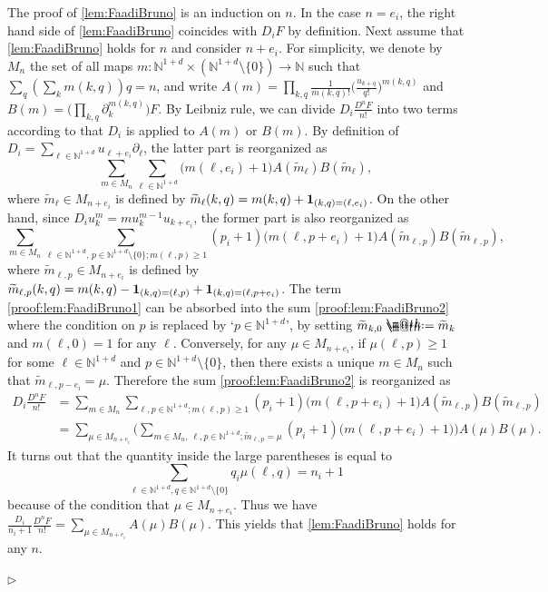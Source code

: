 \documentclass[10pt, reqno]{amsart}
\makeatletter
\numberwithin{subsection}{section}
\numberwithin{subsubsection}{subsection}
\numberwithin{equation}{section} %
\newenvironment{Dem}[1][\unskip]{%
    \begin{list}{\hspace{1.15cm}{\sf \textbf{{\small Proof #1 --}}}}{%
        \setlength{\topsep}{0pt}%
        \setlength{\leftmargin}{0pt}%
        \setlength{\rightmargin}{0pt}%
        \setlength{\listparindent}{0pt}%
        \setlength{\itemindent}{0pt}%
        \setlength{\parsep}{0pt}%
        \addtolength{\leftmargin}{0pt}%
        \addtolength{\rightmargin}{0pt}%
    } \item }{\hfill $\rhd$\end{list}\smallskip}
\theoremstyle{mystyle}
\theoremstyle{mystyle2}
\theoremstyle{mystyle3}
\newcommand\bbN{\mathbb{N}}
\newcommand*{\defeq}{\mathrel{\rlap{%
                     \raisebox{0.3ex}{$\m@th\cdot$}}%
                     \raisebox{-0.3ex}{$\m@th\cdot$}}%
                     =}
\makeatother
\begin{document}
\begin{Dem}
The proof of \eqref{lem:FaadiBruno} is an induction on $n$. In the case $n=e_i$, the right hand side of \eqref{lem:FaadiBruno} coincides with $D_iF$ by definition.
Next assume that \eqref{lem:FaadiBruno} holds for $n$ and consider $n+e_i$.
For simplicity, we denote by $M_n$ the set of all maps $m:\bbN^{1+d}\times(\bbN^{1+d}\setminus\{0\})\to\bbN $ such that $\sum_q(\sum_km(k,q))q=n$, and write $A(m)=\prod_{k,q}\frac1{m(k,q)!}\big(\frac{u_{k+q}}{q!}\big)^{m(k,q)}$ and $B(m)=\big(\prod_{k,q}\partial_k^{m(k,q)}\big)F$.
By Leibniz rule, we can divide $D_i\frac{D^nF}{n!}$ into two terms according to that $D_i$ is applied to $A(m)$ or $B(m)$.
By definition of $D_i=\sum_{\ell\in\bbN^{1+d}}u_{\ell+e_i}\partial_\ell$, the latter part is reorganized as
\begin{equation}\label{proof:lem:FaadiBruno1}
\sum_{m\in M_n}\sum_{\ell\in\bbN^{1+d}}\big(m(\ell,e_i)+1\big)A(\widetilde{m}_\ell)B(\widetilde{m}_\ell),
\end{equation}
where $\widetilde{m}_\ell\in M_{n+e_i}$ is defined by $\widetilde{m}_\ell(k,q)=m(k,q)+{\bf1}_{(k,q)=(\ell,e_i)}$. On the other hand, since $D_iu_k^m=mu_k^{m-1}u_{k+e_i}$, the former part is also reorganized as
\begin{equation}\label{proof:lem:FaadiBruno2}
\sum_{m\in M_n}\sum_{\ell\in\bbN^{1+d},\,p\in\bbN^{1+d}\setminus\{0\};m(\ell,p)\ge1}(p_i+1)\big(m(\ell,p+e_i)+1\big)A(\widetilde{m}_{\ell,p})B(\widetilde{m}_{\ell,p}),
\end{equation}
where $\widetilde{m}_{\ell,p}\in M_{n+e_i}$ is defined by $\widetilde{m}_{\ell,p}(k,q)=m(k,q)-{\bf1}_{(k,q)=(\ell,p)}+{\bf1}_{(k,q)=(\ell,p+e_i)}$. 
The term \eqref{proof:lem:FaadiBruno1} can be absorbed into the sum \eqref{proof:lem:FaadiBruno2} where the condition on $p$ is replaced by `$p\in\bbN^{1+d}$', by setting $\widetilde{m}_{k,0}\defeq\widetilde{m}_k$ and $m(\ell,0)=1$ for any $\ell$. Conversely, for any $\mu\in M_{n+e_i}$, if $\mu(\ell,p)\ge1$ for some $\ell\in\bbN^{1+d}$ and $p\in\bbN^{1+d}\setminus\{0\}$, then there exists a unique $m\in M_n$ such that $\widetilde{m}_{\ell,p-e_i}=\mu$. Therefore the sum \eqref{proof:lem:FaadiBruno2} is reorganized as
\begin{align*}
D_i\frac{D^nF}{n!}&=\sum_{m\in M_n}\sum_{\ell,p\in\bbN^{1+d};m(\ell,p)\ge1}(p_i+1)\big(m(\ell,p+e_i)+1\big)A(\widetilde{m}_{\ell,p})B(\widetilde{m}_{\ell,p})\\
&=\sum_{\mu\in M_{n+e_i}}\bigg(\sum_{m\in M_n,\,\ell,p\in\bbN^{1+d};\widetilde{m}_{\ell,p}=\mu}(p_i+1)\big(m(\ell,p+e_i)+1\big)\bigg)A(\mu)B(\mu).
\end{align*}
It turns out that the quantity inside the large parentheses is equal to
$$
\sum_{\ell\in\bbN^{1+d},q\in\bbN^{1+d}\setminus\{0\}}q_i\mu(\ell,q)=n_i+1
$$
because of the condition that $\mu\in M_{n+e_i}$. Thus we have $\frac{D_i}{n_i+1}\frac{D^nF}{n!}=\sum_{\mu\in M_{n+e_i}}A(\mu)B(\mu)$. This yields that \eqref{lem:FaadiBruno} holds for any $n$.


\end{Dem}
\end{document}

